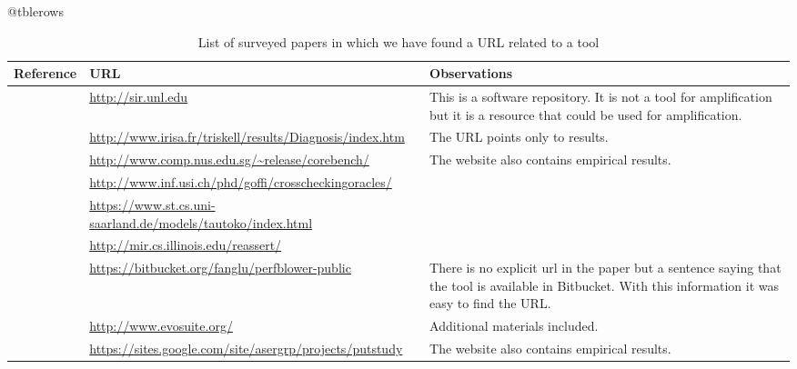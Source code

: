 \expandafter\let\csname c@tblerows\endcsname\rownum

\begin{table*}[ht]
    \caption{List of surveyed papers in which we have found a URL related to a tool}
    \label{tab:table:tools:urls}
    \centering
    \small
    \begin{tabularx}{\textwidth}{lXX}
    \toprule
    Reference & URL & Observations \\
    \midrule

    \cite{SIR}                                & \url{http://sir.unl.edu}                                          & This is a software repository. It is not a tool for amplification but it is a resource that could be used for amplification.\\
    \cite{Baudry:2006:ITS:1134285.1134299}    & \url{http://www.irisa.fr/triskell/results/Diagnosis/index.htm}    & The URL points only to results. \\
    \cite{bohme2014corebench}                 & \url{http://www.comp.nus.edu.sg/~release/corebench/}              & The website also contains empirical results.\\
    \cite{Carzaniga:2014:COI:2568225.2568287} & \url{http://www.inf.usi.ch/phd/goffi/crosscheckingoracles/}       & \\
    \cite{Dallmeier2010}                      & \url{https://www.st.cs.uni-saarland.de/models/tautoko/index.html} & \\
    \cite{reassert2009}                       & \url{http://mir.cs.illinois.edu/reassert/}                        & \\
    \cite{fang2015perfblower}                 & \url{https://bitbucket.org/fanglu/perfblower-public}              & There is no explicit url in the paper but a sentence saying that the tool is available in Bitbucket. With this information it was easy to find the URL. \\
    \cite{fraser2011evosuite}                 & \url{http://www.evosuite.org/}                                    & Additional materials included. \\
    \cite{marri2010retrofitting}              & \url{https://sites.google.com/site/asergrp/projects/putstudy}     & The website also contains empirical results.\\

\end{tabularx}
\end{table*}
